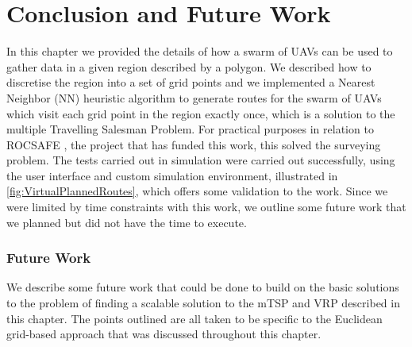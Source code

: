 \section{Conclusion and Future Work}
In this chapter we provided the details of how a swarm of UAVs can be used to gather data in a given region described by a polygon. We described how to discretise the region into a set of grid points and we implemented a Nearest Neighbor (NN) heuristic algorithm to generate routes for the swarm of UAVs which visit each grid point in the region exactly once, which is a solution to the multiple Travelling Salesman Problem. For practical purposes in relation to ROCSAFE \cite{rocsafeNUIG}, the project that has funded this work, this solved the surveying problem. The tests carried out in simulation were carried out successfully, using the user interface and custom simulation environment, illustrated in \ref{fig:VirtualPlannedRoutes}, which offers some validation to the work. Since we were limited by time constraints with this work, we outline some future work that we planned but did not have the time to execute.\par

\subsubsection{Future Work}
We describe some future work that could be done to build on the basic solutions to the problem of finding a scalable solution to the mTSP and VRP described in this chapter. The points outlined are all taken to be specific to the Euclidean grid-based approach that was discussed throughout this chapter.

